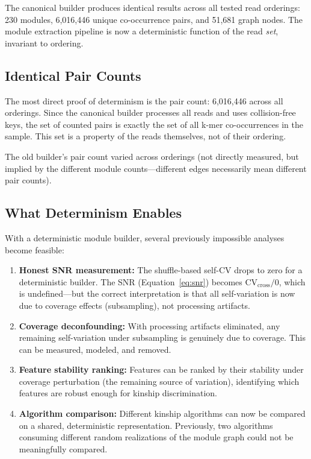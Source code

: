 \documentclass{../yalumba}
\begin{document}
\begin{keyfinding}
The canonical builder produces identical results across all tested read
orderings: 230 modules, 6,016,446 unique co-occurrence pairs, and 51,681
graph nodes. The module extraction pipeline is now a deterministic function
of the read \textit{set}, invariant to ordering.
\end{keyfinding}

\subsection{Identical Pair Counts}

The most direct proof of determinism is the pair count: 6,016,446 across all
orderings. Since the canonical builder processes all reads and uses collision-free
keys, the set of counted pairs is exactly the set of all k-mer co-occurrences
in the sample. This set is a property of the reads themselves, not of their
ordering.

The old builder's pair count varied across orderings (not directly measured,
but implied by the different module counts---different edges necessarily mean
different pair counts).

\subsection{What Determinism Enables}

With a deterministic module builder, several previously impossible analyses
become feasible:

\begin{enumerate}[leftmargin=2em]
  \item \textbf{Honest SNR measurement:} The shuffle-based self-CV drops to
    zero for a deterministic builder. The SNR (Equation~\ref{eq:snr}) becomes
    $\text{CV}_{\text{cross}} / 0$, which is undefined---but the correct
    interpretation is that all self-variation is now due to coverage effects
    (subsampling), not processing artifacts.
  \item \textbf{Coverage deconfounding:} With processing artifacts eliminated,
    any remaining self-variation under subsampling is genuinely due to coverage.
    This can be measured, modeled, and removed.
  \item \textbf{Feature stability ranking:} Features can be ranked by their
    stability under coverage perturbation (the remaining source of variation),
    identifying which features are robust enough for kinship discrimination.
  \item \textbf{Algorithm comparison:} Different kinship algorithms can now be
    compared on a shared, deterministic representation. Previously, two
    algorithms consuming different random realizations of the module graph
    could not be meaningfully compared.
\end{enumerate}
\end{document}
